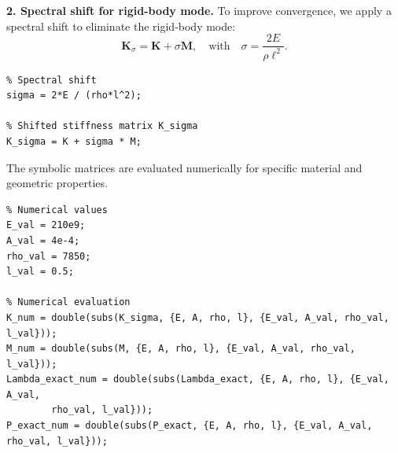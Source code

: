 \documentclass[12pt]{article}
\begin{document}
\textbf{2. Spectral shift for rigid-body mode.} To improve convergence, we apply a spectral shift to eliminate the rigid-body mode:
\[
   \mathbf{K}_\sigma = \mathbf{K} + \sigma \mathbf{M}, \quad \text{with} \quad \sigma = \frac{2E}{\rho \ell^2}.
\]

\begin{verbatim}   
% Spectral shift
sigma = 2*E / (rho*l^2);

% Shifted stiffness matrix K_sigma
K_sigma = K + sigma * M;
\end{verbatim}

The symbolic matrices are evaluated numerically for specific material and geometric properties.

\begin{verbatim}   
% Numerical values
E_val = 210e9; 
A_val = 4e-4; 
rho_val = 7850; 
l_val = 0.5;

% Numerical evaluation
K_num = double(subs(K_sigma, {E, A, rho, l}, {E_val, A_val, rho_val, l_val}));
M_num = double(subs(M, {E, A, rho, l}, {E_val, A_val, rho_val, l_val}));
Lambda_exact_num = double(subs(Lambda_exact, {E, A, rho, l}, {E_val, A_val, 
        rho_val, l_val}));
P_exact_num = double(subs(P_exact, {E, A, rho, l}, {E_val, A_val, rho_val, l_val}));
\end{verbatim}
\end{document}
